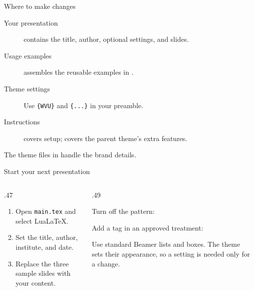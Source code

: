 \begin{frame}[label=reference-start]{Where to make changes}
  \begin{description}
    \item[Your presentation]  contains the title, author,
      optional settings, and slides.
    \item[Usage examples]  assembles the reusable examples
      in .
    \item[Theme settings] Use \texttt{\string\usetheme\{WVU\}} and
      \texttt{\string\wvusetup\{...\}} in your preamble.
    \item[Instructions]  covers setup;
       covers the parent theme's extra features.
  \end{description}
  \medskip
  The theme files in  handle the brand details.
  \par\medskip
  \hyperlink{technique-navigation}{}
\end{frame}

\begin{frame}{Start your next presentation}
  \begin{columns}[T,onlytextwidth]
    \begin{column}{.47\textwidth}
      \begin{enumerate}
        \item Open \texttt{main.tex} and select LuaLaTeX.
        \item Set the title, author, institute, and date.
        \item Replace the three sample slides with your content.
      \end{enumerate}
      \medskip
      \href{https://ctan.org/pkg/beamerthemeamurmaple}{}
    \end{column}
    \begin{column}{.49\textwidth}
      \par
      \medskip
      Turn off the pattern:
      \par\smallskip
      {\small\texttt{}}\par
      \medskip
      Add a tag in an approved treatment:
      \par\smallskip
      {\small\texttt{}}\par
      \medskip
      Use standard Beamer lists and boxes. The theme sets their
      appearance, so a setting is needed only for a change.
    \end{column}
  \end{columns}
\end{frame}
